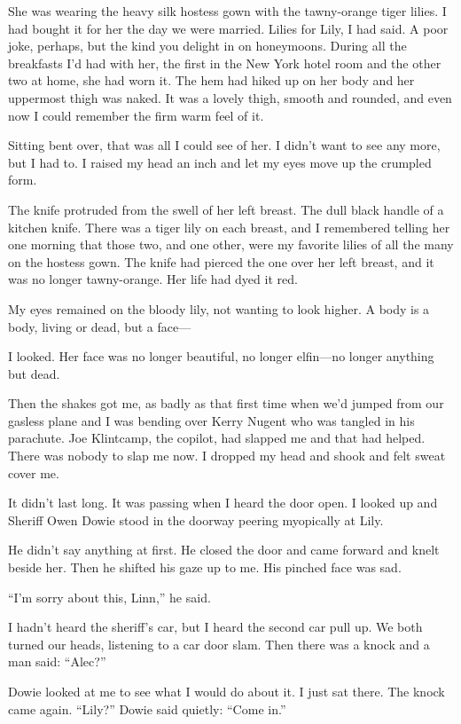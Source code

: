 \documentclass{novel}
\begin{document}
She was wearing the heavy silk hostess gown with the tawny-orange tiger lilies. I had bought it for her the day we were married. Lilies for Lily, I had said. A poor joke, perhaps, but the kind you delight in on honeymoons. During all the breakfasts I’d had with her, the first in the New York hotel room and the other two at home, she had worn it. The hem had hiked up on her body and her uppermost thigh was naked. It was a lovely thigh, smooth and rounded, and even now I could remember the firm warm feel of it.

Sitting bent over, that was all I could see of her. I didn’t want to see any more, but I had to. I raised my head an inch and let my eyes move up the crumpled form.

The knife protruded from the swell of her left breast. The dull black handle of a kitchen knife. There was a tiger lily on each breast, and I remembered telling her one morning that those two, and one other, were my favorite lilies of all the many on the hostess gown. The knife had pierced the one over her left breast, and it was no longer tawny-orange. Her life had dyed it red.

My eyes remained on the bloody lily, not wanting to look higher. A body is a body, living or dead, but a face—

I looked. Her face was no longer beautiful, no longer elfin—no longer anything but dead.

Then the shakes got me, as badly as that first time when we’d jumped from our gasless plane and I was bending over Kerry Nugent who was tangled in his parachute. Joe Klintcamp, the copilot, had slapped me and that had helped. There was nobody to slap me now. I dropped my head and shook and felt sweat cover me.

It didn’t last long. It was passing when I heard the door open. I looked up and Sheriff Owen Dowie stood in the doorway peering myopically at Lily.

He didn’t say anything at first. He closed the door and came forward and knelt beside her. Then he shifted his gaze up to me. His pinched face was sad.

“I’m sorry about this, Linn,” he said.

I hadn’t heard the sheriff’s car, but I heard the second car pull up. We both turned our heads, listening to a car door slam. Then there was a knock and a man said: “Alec?”

Dowie looked at me to see what I would do about it. I just sat there. The knock came again. “Lily?” Dowie said quietly: “Come in.”
\end{document}
